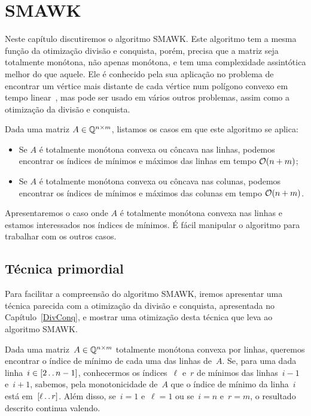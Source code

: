 \chapter{SMAWK}
\label{SMAWK}


Neste capítulo discutiremos o algoritmo SMAWK. Este algoritmo tem a mesma função da otimização divisão e conquista, porém, precisa que a matriz seja totalmente monótona, não apenas monótona, e tem uma complexidade assintótica melhor do que aquele. Ele é conhecido pela sua aplicação no problema de encontrar um vértice mais distante de cada vértice num polígono convexo em tempo linear~\cite{Aggarwal:1987}, mas pode ser usado em vários outros problemas, assim como a otimização da divisão e conquista.

Dada uma matriz $A \in \mathbb{Q}^{n \times m}$, listamos os casos em que este algoritmo se aplica:
\begin{itemize}
    \item Se $A$ é totalmente monótona convexa ou côncava nas linhas, podemos encontrar os índices de mínimos e máximos das linhas em tempo $\mathcal{O}(n + m)$;
    \item Se $A$ é totalmente monótona convexa ou côncava nas colunas, podemos encontrar os índices de mínimos e máximos das colunas em tempo $\mathcal{O}(n + m)$.
\end{itemize}

Apresentaremos o caso onde $A$ é totalmente monótona convexa nas linhas e estamos interessados nos índices de mínimos. É fácil manipular o algoritmo para trabalhar com os outros casos.


\section{Técnica primordial} \label{SMAWK:primordial}
Para facilitar a compreensão do algoritmo SMAWK, iremos apresentar uma técnica parecida com a otimização da divisão e conquista, apresentada no Capítulo~\ref{DivConq}, e mostrar uma otimização desta técnica que leva ao algoritmo SMAWK.

Dada uma matriz~$A \in \mathbb{Q}^{n \times m}$ totalmente monótona convexa por linhas, queremos encontrar o índice de mínimo de cada uma das linhas de~$A$. Se, para uma dada linha~${ i \in [2 \,.\,.\, n-1] }$, conhecermos os índices~$\ell$ e~$r$ de mínimos das linhas~${ i-1 }$ e~${ i+1 }$, sabemos, pela monotonicidade de~$A$ que o índice de mínimo da linha~$i$ está em~${ [\ell \,.\,.\, r] }$. Além disso, se~${ i = 1 }$ e~${ \ell = 1 }$ ou se~${ i = n }$ e~${ r = m }$, o resultado descrito continua valendo.

